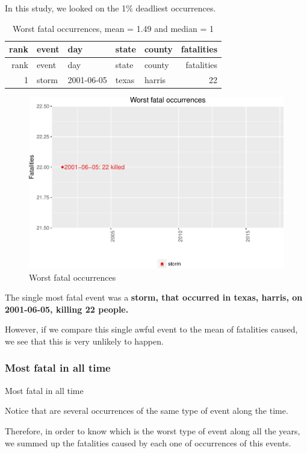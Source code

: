 \documentclass[]{article}
\begin{document}
In this study, we looked on the 1\% deadliest occurrences.

\begin{longtable}[]{@{}rllllr@{}}
\caption{Worst fatal occurrences, mean = 1.49 and median =
1}\tabularnewline
\toprule
rank & event & day & state & county & fatalities\tabularnewline
\midrule
\endfirsthead
\toprule
rank & event & day & state & county & fatalities\tabularnewline
\midrule
\endhead
1 & storm & 2001-06-05 & texas & harris & 22\tabularnewline
\bottomrule
\end{longtable}

\begin{figure}[htbp]
\centering
\includegraphics{readme_files/figure-latex/fatal-plot-single-1.pdf}
\caption{Worst fatal occurrences}
\end{figure}

The single most fatal event was a \textbf{storm, that occurred in texas,
harris, on 2001-06-05, killing 22 people.}

However, if we compare this single awful event to the mean of fatalities
caused, we see that this is very unlikely to happen.

\subsubsection{Most fatal in all time}\label{most-fatal-in-all-time}

Most fatal in all time

Notice that are several occurrences of the same type of event along the
time.

Therefore, in order to know which is the worst type of event along all
the years, we summed up the fatalities caused by each one of occurrences
of this events.
\end{document}
